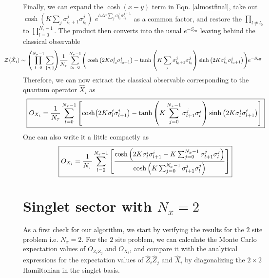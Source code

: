\documentclass[../journal_main.tex]{subfiles}
\begin{document}
Finally, we can expand the $\cosh(x-y)$ term in Eqn. \eqref{almostfinal}, take out $\cosh(K \sum_j \sigma^j_{l_0+1} \sigma^j_{l_0})$ $e^{ h \Delta \tau  \sum_j \sigma^j_{l_0} \sigma^{j+1}_{l_0}}$ as a common factor, and restore the $\prod_{l \neq l_0}$ to $\prod_{l = 0}^{N_\tau - 1}$. The product then converts into the usual $e^{-S_\text{eff}}$ leaving behind the classical observable
\begin{align}
    & \hspace*{-1.2cm} \mathcal{Z} \langle \hat{X}_i \rangle \sim \qty(\prod_{l=0}^{N_\tau - 1} \sum_{\{\sigma_l \}}) \frac{1}{N_\tau} \sum_{l_0 = 0}^{N_\tau - 1} \Bigg( \cosh\qty(2K \sigma^{i}_{l_0} \sigma^{i}_{l_0 + 1}) - \tanh\qty(K \sum_j \sigma^j_{l_0+1} \sigma^j_{l_0}) \sinh\qty(2K \sigma^{i}_{l_0} \sigma^{i}_{l_0 + 1}) \Bigg)e^{-S_\text{eff}}
\end{align}
Therefore, we can now extract the classical observable corresponding to the quantum operator $\hat{X}_i$ as
\begin{equation}
    \boxed{
        O_{{X}_i} = \frac{1}{N_\tau} \sum_{l=0}^{N_\tau -1} \qty[\cosh(2K\sigma^{i}_{l} \sigma^{i}_{l + 1}) - \tanh\qty(K \sum_{j=0}^{N_x-1} \sigma^j_{l+1} \sigma^j_{l}) \sinh\qty(2K \sigma^{i}_{l} \sigma^{i}_{l + 1}) ]
    }
     \label{classicalxi_1}
\end{equation} 
One can also write it a little compactly as 
\begin{equation}
    \boxed{
        O_{{X}_i} = \frac{1}{N_\tau} \sum_{l=0}^{N_\tau -1} \qty[\frac{\cosh\qty(2K\sigma^{i}_{l} \sigma^{i}_{l + 1} - K \sum_{j=0}^{N_x-1} \sigma^j_{l+1} \sigma^j_{l})}{\cosh\qty(K \sum_{j=0}^{N_x-1} \sigma^j_{l+1} \sigma^j_{l})}]
    }
    \label{classicalxi_2}
\end{equation}




\section{Singlet sector with $N_x = 2$}
As a first check for our algorithm, we start by verifying the results for the $2$ site problem i.e. $N_x = 2$. For the $2$ site problem, we can calculate the Monte Carlo expectation values of $O_{Z_i Z_j}$ and $O_{X_i}$, and compare it with the analytical expressions for the expectation values of $\hat{Z}_i \hat{Z}_j$ and $\hat{X}_i$ by diagonalizing the $2 \times 2$ Hamiltonian in the singlet basis.
\end{document}
